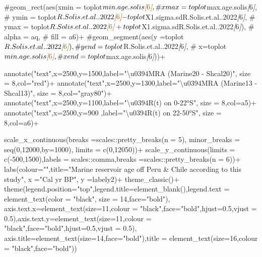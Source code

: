 \documentclass[
]{article}
\newenvironment{Shaded}{\begin{snugshade}}{\end{snugshade}}
\newcommand{\CommentTok}[1]{\textcolor[rgb]{0.56,0.35,0.01}{\textit{#1}}}
\newcommand{\NormalTok}[1]{#1}
\newcommand{\OtherTok}[1]{\textcolor[rgb]{0.56,0.35,0.01}{#1}}
\begin{document}
\begin{Shaded}
\begin{Highlighting}[]
\NormalTok{  \#geom\_rect(aes(xmin = toplot$min.age.solis}\CommentTok{[}\OtherTok{6}\CommentTok{]}\NormalTok{, }
\NormalTok{  \#              xmax = toplot$max.age.solis}\CommentTok{[}\OtherTok{6}\CommentTok{]}\NormalTok{, }
\NormalTok{  \#              ymin = toplot$R.Solis.et.al..2022}\CommentTok{[}\OtherTok{6}\CommentTok{]}\NormalTok{{-}toplot$X1.sigma.sdR.Solis.et.al..2022}\CommentTok{[}\OtherTok{6}\CommentTok{]}\NormalTok{,}
\NormalTok{  \#              ymax = toplot$R.Solis.et.al..2022}\CommentTok{[}\OtherTok{6}\CommentTok{]}\NormalTok{+toplot$X1.sigma.sdR.Solis.et.al..2022}\CommentTok{[}\OtherTok{6}\CommentTok{]}\NormalTok{),}
\NormalTok{  \#          alpha = aq,}
\NormalTok{  \#          fill = a6)+}
\NormalTok{  \#geom\_segment(aes(y =toplot$R.Solis.et.al..2022}\CommentTok{[}\OtherTok{6}\CommentTok{]}\NormalTok{),}
\NormalTok{   \#                yend =toplot$R.Solis.et.al..2022}\CommentTok{[}\OtherTok{6}\CommentTok{]}\NormalTok{,}
\NormalTok{    \#               x=toplot$min.age.solis}\CommentTok{[}\OtherTok{6}\CommentTok{]}\NormalTok{,}
\NormalTok{     \#              xend=toplot$max.age.solis}\CommentTok{[}\OtherTok{6}\CommentTok{]}\NormalTok{))+}

\NormalTok{  annotate("text",x=2500,y=1500,label="\textbackslash{}u0394MRA (Marine20 {-} Shcal20)", size = 8,col="red")+}
\NormalTok{  annotate("text",x=2500,y=1300,label="\textbackslash{}u0394MRA (Marine13 {-} Shcal13)", size = 8,col="gray80")+}
\NormalTok{  annotate("text",x=2500,y=1100,label="\textbackslash{}u0394R(t) on  0{-}22°S", size = 8,col=a5)+}
\NormalTok{  annotate("text",x=2500,y=900 ,label="\textbackslash{}u0394R(t) on 22{-}50°S", size = 8,col=a6)+}

\NormalTok{  scale\_x\_continuous(breaks =scales::pretty\_breaks(n = 5),}
\NormalTok{                     minor\_breaks = seq(0,12000,by=1000),}
\NormalTok{                     limits = c(0,12050))+}
\NormalTok{  scale\_y\_continuous(limits = c({-}500,1500),labels = scales::comma,breaks =scales::pretty\_breaks(n = 6))+}
\NormalTok{  labs(colour="",title="Marine reservoir age off Peru \& Chile according to this study",}
\NormalTok{       x ="Cal yr BP", }
\NormalTok{       y =labely2)+}
\NormalTok{  theme\_classic()+}
\NormalTok{  theme(legend.position="top",legend.title=element\_blank(),legend.text = element\_text(color = "black", size = 14,face="bold"),}
\NormalTok{        axis.text.x=element\_text(size=11,colour = "black",face="bold",hjust=0.5,vjust = 0.5),axis.text.y=element\_text(size=11,colour = "black",face="bold",hjust=0.5,vjust = 0.5),}
\NormalTok{        axis.title=element\_text(size=14,face="bold"),title = element\_text(size=16,colour = "black",face="bold"))}


\end{Highlighting}
\end{Shaded}
\end{document}
